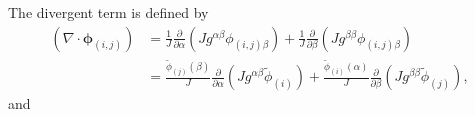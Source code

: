 \documentclass{article}
\newcommand{\vg}{\boldsymbol}
\newcommand{\pdiff}[2]{\frac{\partial #1}{\partial #2}}
\begin{document}
The divergent term is defined by
\begin{align}
(\nabla \cdot \vg{\phi}_{(i,j)}) &= \frac{1}{J} \pdiff{}{\alpha} \left( J g^{\alpha \beta} \phi_{(i,j) \beta} \right) + \frac{1}{J} \pdiff{}{\beta} \left( J g^{\beta \beta} \phi_{(i,j) \beta} \right) \\
&= \frac{\tilde{\phi}_{(j)}(\beta)}{J} \pdiff{}{\alpha} \left( J g^{\alpha \beta} \tilde{\phi}_{(i)} \right) + \frac{\tilde{\phi}_{(i)}(\alpha)}{J} \pdiff{}{\beta} \left( J g^{\beta \beta} \tilde{\phi}_{(j)} \right),
\end{align} and
\end{document}
